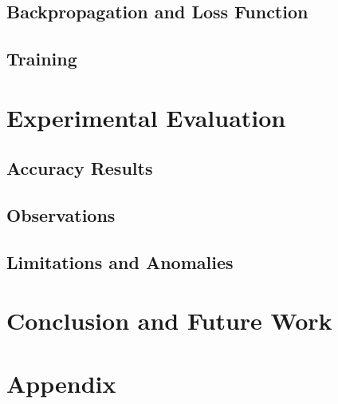 \documentclass[11pt]{article}
\begin{document}
\subsection{Backpropagation and Loss Function}

\subsection{Training}

\section{Experimental Evaluation}
\subsection{Accuracy Results}

\subsection{Observations}

\subsection{Limitations and Anomalies}

\section{Conclusion and Future Work}

\appendix
\section*{Appendix}

\begin{thebibliography}{9}
\end{thebibliography}
\end{document}
